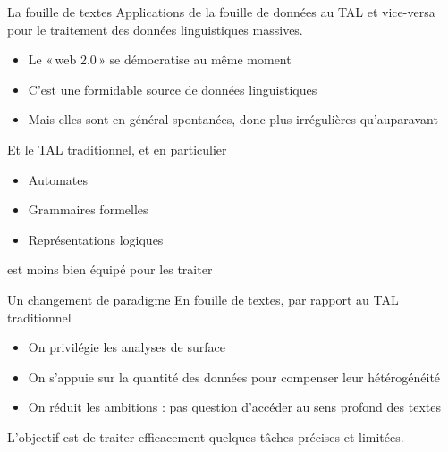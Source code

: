 \documentclass[xcolor={svgnames}, french]{beamer}
\begin{document}
\begin{frame}{La fouille de textes}
	Applications de la fouille de données au \alert{TAL} et vice-versa pour le traitement des données linguistiques massives.

	\begin{itemize}
		\item Le « web 2.0 » se démocratise au même moment
		\item C'est une formidable source de données linguistiques
		\item Mais elles sont en général spontanées, donc plus \alert{irrégulières} qu'auparavant
	\end{itemize}

	Et le TAL traditionnel, et en particulier
	\begin{itemize}
		\item Automates
		\item Grammaires formelles
		\item Représentations logiques
	\end{itemize}
	est moins bien équipé pour les traiter
\end{frame}

\begin{frame}{Un changement de paradigme}
	En fouille de textes, par rapport au TAL traditionnel
	\begin{itemize}
		\item On privilégie les \alert{analyses de surface}
		\item On s'appuie sur la \alert{quantité des données} pour compenser leur hétérogénéité
		\item On réduit les ambitions : pas question d'accéder au sens profond des textes
	\end{itemize}

	L'objectif est de traiter efficacement quelques \alert{tâches} précises et limitées.
\end{frame}
\end{document}
